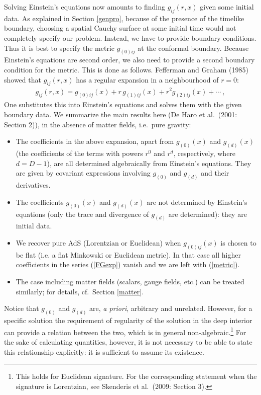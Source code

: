 \documentclass[12pt]{article}
\renewcommand{\^}[1]{\hat{#1}}
\newcommand{\bea}{\begin{eqnarray}}
\newcommand{\eea}{\end{eqnarray}}
\newcommand{\eq}[1]{(\ref{#1})}
\begin{document}
Solving Einstein's equations now amounts to finding $g_{ij}(r,x)$ given some initial data. As explained in Section \ref{genpro}, because of the presence of the timelike
boundary, choosing a spatial Cauchy surface at some initial time would not completely specify our problem. Instead, we have to provide boundary conditions. Thus it is best to specify the metric $g_{(0)ij}$ at the conformal boundary. Because Einstein's equations are second order, we also need to provide a second boundary condition for the metric. This is done as follows. Fefferman and Graham (1985) showed that $g_{ij}(r,x)$ has a regular expansion in a neighbourhood of $r=0$:
\bea\label{FGexp}
g_{ij}(r,x)=g_{(0)ij}(x)+r\,g_{(1)ij}(x)+r^2 g_{(2)ij}(x)+\cdots~,
\eea
One substitutes this into Einstein's equations and solves them with the given boundary data. We summarize the main results here (De Haro et al.~(2001: Section 2)), in the absence of matter fields, i.e.~pure gravity:
\begin{itemize}
\item The coefficients in the above expansion, apart from  $g_{(0)}(x)$ and $g_{(d)}(x)$ (the coefficients of the terms with powers $r^0$ and $r^d$, respectively, where $d=D-1$), are all determined algebraically from Einstein's equations. They are given by covariant expressions involving $g_{(0)}$ and $g_{(d)}$ and their derivatives.
\item The coefficients $g_{(0)}(x)$ and $g_{(d)}(x)$  are not determined by Einstein's equations (only the trace and divergence of $g_{(d)}$ are determined): they are initial data.
\item We recover pure AdS (Lorentzian or Euclidean) when $g_{(0)ij}(x)$ is chosen to be flat (i.e. a flat Minkowski or Euclidean metric). In that case all higher coefficients in the series \eq{FGexp} vanish and we are left with \eq{metric}.
\item The case including matter fields (scalars, gauge fields, etc.) can be treated similarly; for details, cf.~Section \ref{matter}.
\end{itemize}
Notice that $g_{(0)}$ and $g_{(d)}$ are, {\em a priori}, arbitrary and unrelated. However, for a specific solution the requirement of regularity of the solution in the deep interior can provide a relation between the two, which is in general non-algebraic.\footnote{This holds for Euclidean signature. For the corresponding statement when the signature is Lorentzian, see Skenderis et al.~(2009: Section 3).} For the sake of calculating quantities, however, it is not necessary to be able to state this relationship explicitly: it is sufficient to assume its existence.
\end{document}
